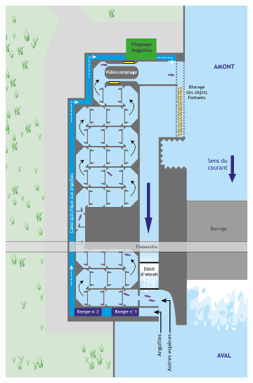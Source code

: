 \documentclass[11pt,titlepage,twoside]{article}\usepackage[]{graphicx}\usepackage[table]{xcolor}
\begin{document}
\begin{figure}[hptb]
    \centering
    \begin{subfigure}[b]{0.40\textwidth}
        \includegraphics[width=\textwidth]{schema_passe_rd_poses}
    \end{subfigure}
    \begin{subfigure}[b]{0.448\textwidth}

\end{subfigure}
\end{figure}
\end{document}
